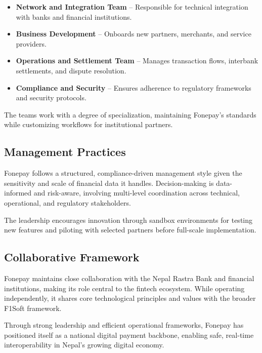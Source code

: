 \documentclass[12pt, a4paper]{report}
\begin{document}
\begin{itemize}
  \item \textbf{Network and Integration Team} – Responsible for technical integration with banks and financial institutions.
  \item \textbf{Business Development} – Onboards new partners, merchants, and service providers.
  \item \textbf{Operations and Settlement Team} – Manages transaction flows, interbank settlements, and dispute resolution.
  \item \textbf{Compliance and Security} – Ensures adherence to regulatory frameworks and security protocols.
\end{itemize}

The teams work with a degree of specialization, maintaining Fonepay’s standards while customizing workflows for institutional partners.
\vspace{18pt}
\subsection{Management Practices}

Fonepay follows a structured, compliance-driven management style given the sensitivity and scale of financial data it handles. Decision-making is data-informed and risk-aware, involving multi-level coordination across technical, operational, and regulatory stakeholders.

The leadership encourages innovation through sandbox environments for testing new features and piloting with selected partners before full-scale implementation.
\vspace{18pt}
\subsection{Collaborative Framework}

Fonepay maintains close collaboration with the Nepal Rastra Bank and financial institutions, making its role central to the fintech ecosystem. While operating independently, it shares core technological principles and values with the broader F1Soft framework.

\bigskip

Through strong leadership and efficient operational frameworks, Fonepay has positioned itself as a national digital payment backbone, enabling safe, real-time interoperability in Nepal’s growing digital economy.
\vspace{18pt}
\end{document}
